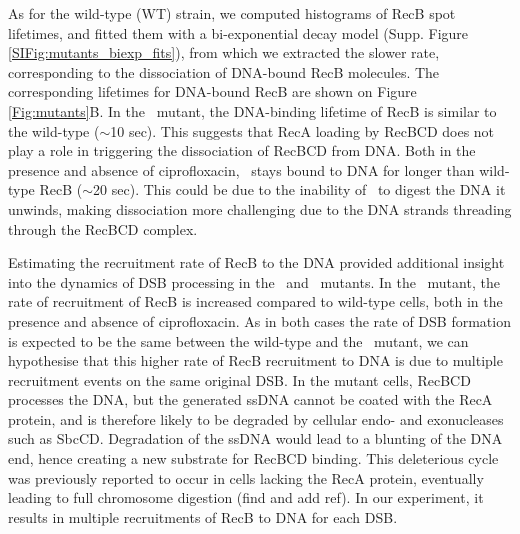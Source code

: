 As for the wild-type (WT) strain, we computed histograms of RecB spot lifetimes, and fitted them with a bi-exponential decay model (Supp. Figure \ref{SIFig:mutants_biexp_fits}), from which we extracted the slower rate, corresponding to the dissociation of DNA-bound RecB molecules. The corresponding lifetimes for DNA-bound RecB are shown on Figure \ref{Fig:mutants}B. In the \dreca\ mutant, the DNA-binding lifetime of RecB is similar to the wild-type ($\sim$10 sec). This suggests that RecA loading by RecBCD does not play a role in triggering the dissociation of RecBCD from DNA. Both in the presence and absence of ciprofloxacin, \teneighty\ stays bound to DNA for longer than wild-type RecB ($\sim$20 sec). This could be due to the inability of \teneighty\ to digest the DNA it unwinds, making dissociation more challenging due to the DNA strands threading through the RecBCD complex.

Estimating the recruitment rate of RecB to the DNA provided additional insight into the dynamics of DSB processing in the \dreca\ and \teneighty\ mutants. In the \dreca\ mutant, the rate of recruitment of RecB is increased compared to wild-type cells, both in the presence and absence of ciprofloxacin. As in both cases the rate of DSB formation is expected to be the same between the wild-type and the \dreca\ mutant, we can hypothesise that this higher rate of RecB recruitment to DNA is due to multiple recruitment events on the same original DSB. In the mutant cells, RecBCD processes the DNA, but the generated ssDNA cannot be coated with the RecA protein, and is therefore likely to be degraded by cellular endo- and exonucleases such as SbcCD. Degradation of the ssDNA would lead to a blunting of the DNA end, hence creating a new substrate for RecBCD binding. This deleterious cycle was previously reported to occur in cells lacking the RecA protein, eventually leading to full chromosome digestion (find and add ref). In our experiment, it results in multiple recruitments of RecB to DNA for each DSB.

